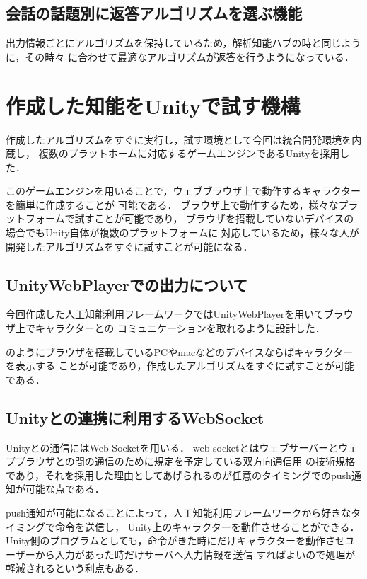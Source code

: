\subsection{会話の話題別に返答アルゴリズムを選ぶ機能}
出力情報ごとにアルゴリズムを保持しているため，解析知能ハブの時と同じように，その時々
に合わせて最適なアルゴリズムが返答を行うようになっている．
\newpage
\section{作成した知能をUnityで試す機構}
作成したアルゴリズムをすぐに実行し，試す環境として今回は統合開発環境を内蔵し，
複数のプラットホームに対応するゲームエンジンであるUnityを採用した．

このゲームエンジンを用いることで，ウェブブラウザ上で動作するキャラクターを簡単に作成することが
可能である．
ブラウザ上で動作するため，様々なプラットフォームで試すことが可能であり，
ブラウザを搭載していないデバイスの場合でもUnity自体が複数のプラットフォームに
対応しているため，様々な人が開発したアルゴリズムをすぐに試すことが可能になる．

\subsection{UnityWebPlayerでの出力について}
今回作成した人工知能利用フレームワークではUnityWebPlayerを用いてブラウザ上でキャラクターとの
コミュニケーションを取れるように設計した．


のようにブラウザを搭載しているPCやmacなどのデバイスならばキャラクターを表示する
ことが可能であり，作成したアルゴリズムをすぐに試すことが可能である．

\subsection{Unityとの連携に利用するWebSocket}
Unityとの通信にはWeb Socketを用いる．
web socketとはウェブサーバーとウェブブラウザとの間の通信のために規定を予定している双方向通信用
の技術規格であり，それを採用した理由としてあげられるのが任意のタイミングでのpush通知が可能な点である．

push通知が可能になることによって，人工知能利用フレームワークから好きなタイミングで命令を送信し，
Unity上のキャラクターを動作させることができる．
Unity側のプログラムとしても，命令がきた時にだけキャラクターを動作させユーザーから入力があった時だけサーバへ入力情報を送信
すればよいので処理が軽減されるという利点もある．

